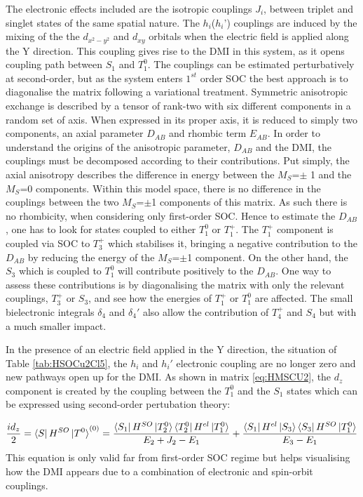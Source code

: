 \documentclass[12pt]{report}
\numberwithin{equation}{section}
\begin{document}
The electronic effects included are the isotropic couplings $J_i$, between triplet and singlet states of the same spatial nature. 
The $h_i$($h_i$') couplings are induced by the mixing of the the $d_{x^2-y^2}$ and $d_{xy}$ orbitals when the electric field is applied along the Y direction.
This coupling gives rise to the DMI in this system, as it opens coupling path between $S_1$ and $T_1^0$.
The couplings can be estimated perturbatively at second-order, but as the system enters $1^{st}$ order SOC the best approach is to diagonalise the matrix following a variational treatment.
Symmetric anisotropic exchange is described by a tensor of rank-two with six different components in a random set of axis.
When expressed in its proper axis, it is reduced to simply two components, an axial parameter $D_{AB}$ and rhombic term $E_{AB}$.
In order to understand the origins of the anisotropic parameter, $D_{AB}$ and the DMI, the couplings must be decomposed according to their contributions.
Put simply, the axial anisotropy describes the difference in energy between the $M_S$=$\pm$ 1 and the $M_S$=0 components.
Within this model space, there is no difference in the couplings between the two $M_S$=$\pm$1 components of this matrix.
As such there is no rhombicity, when considering only first-order SOC.
Hence to estimate the $D_{AB}$, one has to look for states coupled to either $T_1^0$ or $T_1^+$.
The $T_1^+$ component is coupled via SOC to $T_3^+$ which stabilises it, bringing a negative contribution to the $D_{AB}$ by reducing the energy of the $M_S$=$\pm$1 component.
On the other hand, the $S_3$ which is coupled to $T_1^0$ will contribute positively to the $D_{AB}$. 
One way to assess these contributions is by diagonalising the matrix with only the relevant couplings, $T_3^+$ or $S_3$, and see how the energies of $T_1^+$ or $T_1^0$ are affected.
The small bielectronic integrals $\delta_4$ and $\delta_4'$ also allow the contribution of $T_4^+$ and $S_4$ but with a much smaller impact.

In the presence of an electric field applied in the Y direction, the situation of Table \ref{tab:HSOCu2Cl5}, the $h_i$ and $h_i'$ electronic coupling are no longer zero and new pathways open up for the DMI.
As shown in matrix \ref{eq:HMSCU2}, the $d_z$ component is created by the coupling between the $T_1^0$ and the $S_1$ states which can be expressed using second-order pertubation theory:

\begin{equation}\label{eq:chemindmi}
    \frac{id_z}{2}=\bra{S}H^{SO}\ket{T^0}^{(0)}=\frac{\bra{S_1}H^{SO}\ket{T_2^0}\bra{T_2^0}H^{el}\ket{T_1^0}}{E_2+J_2-E_1}+\frac{\bra{S_1}H^{el}\ket{S_3}\bra{S_3}H^{SO}\ket{T_1^0}}{E_3-E_1}
\end{equation}
This equation is only valid far from first-order SOC regime but helps visualising how the DMI appears due to a combination of electronic and spin-orbit couplings.
\end{document}
